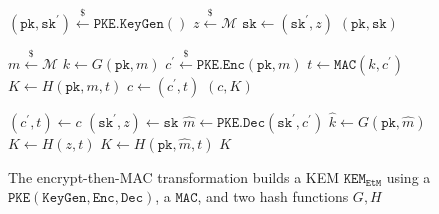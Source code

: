 \documentclass[journal=tches,submission]{iacrtrans}
\newcommand{\pke}{\texttt{PKE}}
\newcommand{\keygen}{\texttt{KeyGen}}
\newcommand{\encrypt}{\texttt{Enc}}
\newcommand{\decrypt}{\texttt{Dec}}
\newcommand{\kem}{\texttt{KEM}}
\newcommand{\encap}{\texttt{Encap}}
\newcommand{\decap}{\texttt{Decap}}
\newcommand{\etm}{\texttt{EtM}}  %
\newcommand{\mac}{\texttt{MAC}}
\newcommand{\pk}{\texttt{pk}}
\newcommand{\sk}{\texttt{sk}}
\newcommand{\leftsample}{\stackrel{\$}{\leftarrow}}
\begin{document}
\begin{figure}[h]
    \centering
    \begin{minipage}[t]{0.5\textwidth}
        \begin{algorithm}[H]
            \caption*{$\kem_\etm.\keygen()$}
            \begin{algorithmic}[1]
                \State $(\pk, \sk^\prime) \leftsample \pke\texttt{.}\keygen()$
                \State $z \leftsample \mathcal{M}$
                \State $\sk \leftarrow (\sk^\prime, z)$
                \State \Return $(\pk, \sk)$
            \end{algorithmic}
        \end{algorithm}
        \begin{algorithm}[H]
            \caption*{$\kem_\etm.\encap(\pk)$}
            \begin{algorithmic}[1]
                \State $m \leftsample \mathcal{M}$
                \State $k \leftarrow G(\pk, m)$
                \State $c^\prime \leftsample \pke\texttt{.}\encrypt(\pk, m)$
                \State $t \leftarrow \mac(k, c^\prime)$
                \State $K \leftarrow H(\pk, m, t)$
                \State $c \leftarrow (c^\prime, t)$
                \State \Return $(c, K)$
            \end{algorithmic}
        \end{algorithm}
    \end{minipage}\hfill
    \begin{minipage}[t]{0.49\textwidth}
        \begin{algorithm}[H]
            \caption*{$\kem_\etm.\decap(\sk, c)$}
            \begin{algorithmic}[1]
                \State $(c^\prime, t) \leftarrow c$
                \State $(\sk^\prime, z) \leftarrow \sk$
                \State $\hat{m} \leftarrow \pke\texttt{.}\decrypt(\sk^\prime, c^\prime)$
                \State $\hat{k} \leftarrow G(\pk, \hat{m})$
                \If{$\mac(\hat{k}, c^\prime) \neq t$}
                    \State $K \leftarrow H(z, t)$
                \Else
                    \State $K \leftarrow H(\pk, \hat{m}, t)$
                \EndIf
                \State \Return $K$
            \end{algorithmic}
        \end{algorithm}
    \end{minipage}
    \caption{The encrypt-then-MAC transformation builds a KEM $\kem_\etm$ using a $\pke(\keygen, \encrypt, \decrypt)$, a $\mac$, and two hash functions $G, H$}\label{fig:etm-routines} 
\end{figure}
\end{document}
